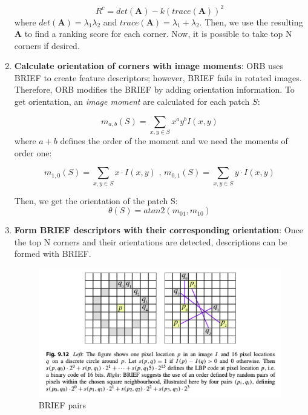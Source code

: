 \documentclass[a4paper]{report}
\numberwithin{figure}{section}
\begin{document}
\begin{enumerate}
    \begin{equation}
      R^c = det(\mathbf{A}) - k(trace(\mathbf{A}))^2
    \end{equation}
    where $det(\mathbf{A}) = \lambda_1 \lambda_2$ and 
    $trace(\mathbf{A}) = \lambda_1 + \lambda_2$.
    Then, we use the resulting $\mathbf{A}$ to find a ranking score for each 
    corner. Now, it is possible to take top N corners if desired.

  \item \textbf{Calculate orientation of corners with image moments}: 
    ORB uses BRIEF to create feature descriptors; however, BRIEF fails in 
    rotated images. Therefore, ORB modifies the BRIEF by adding orientation 
    information. To get orientation, an \textit{image moment} are calculated
    for each patch $S$:

    \begin{equation}
      m_{a,b}(S) = \sum_{x,y \in S} x^a y^b I(x,y)
    \end{equation}
    where $a + b$ defines the order of the moment and we need 
    the moments of order one:

    \begin{equation}
      m_{1,0}(S) = \sum_{x,y \in S} x \cdot I(x,y) \text{  ,  }
      m_{0,1}(S) = \sum_{x,y \in S} y \cdot I(x,y)
    \end{equation}

    Then, we get the orientation of the patch S:
    \begin{equation}
      \theta(S) = atan2(m_{01}, m_{10})
    \end{equation}

  \item \textbf{Form BRIEF descriptors with their corresponding orientation}:
    Once the top N corners and their orientations are detected, descriptions 
    can be formed with BRIEF. 

\begin{figure}[H]
	\centering
  \includegraphics[width=\linewidth,natwidth=640,natheight=640]
  {fig/ref_imgs/brief.png}
  \caption{BRIEF pairs}
  \label{fig:brief_pairs}
\end{figure}



\end{enumerate}
\end{document}
